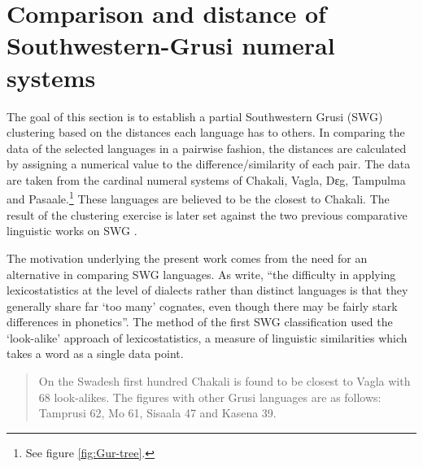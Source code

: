 
\clearpage

\section{Comparison and distance of Southwestern-Grusi numeral
systems}
\label{sec:NUM-dist-recons}

The goal of this section is to establish a partial Southwestern Grusi (SWG)
clustering  based on the distances each language has to others.   In comparing
the data of  the selected languages in a pairwise fashion, the distances are
calculated by assigning a numerical value to the difference/similarity  of each
pair.  The data are taken from  the cardinal numeral systems of  Chakali, Vagla,
Dɛg, Tampulma and Pasaale.\footnote{See figure \ref{fig:Gur-tree}.} These
languages are believed to be the closest to Chakali. The result of the
clustering exercise is later set against the two previous comparative linguistic
works on SWG \citep{Bend65, Mane69a, Mane69b}.

The motivation underlying the present work comes from the need for an
alternative  in comparing SWG languages.  As \citet[43]{Hegg05} write,  ``the
difficulty in applying lexicostatistics at the level of dialects rather than
distinct languages is that they generally share far `too many' cognates, even
though there may be fairly stark differences in phonetics''.  The method of the
first SWG classification  \citep{Bend65} used the `look-alike'  approach of
lexicostatistics,  a measure of linguistic similarities which takes a word as a
single data point.  

\begin{quote}
On the Swadesh first hundred Chakali is found to be closest to
Vagla with 68 look-alikes. The figures with other Grusi languages are as
follows: Tamprusi 62, Mo 61, Sisaala 47 and Kasena 39.
\end{quote}

